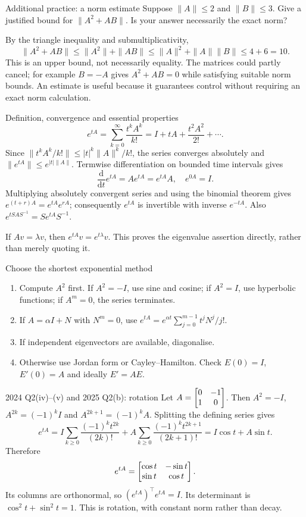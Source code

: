 \begin{question}{Additional practice: a norm estimate}
Suppose $\|A\|\leq2$ and $\|B\|\leq3$. Give a justified bound for $\|A^2+AB\|$. Is your answer necessarily the exact norm?
\end{question}
\begin{answer}
By the triangle inequality and submultiplicativity,
\[\|A^2+AB\|\leq\|A^2\|+\|AB\|\leq\|A\|^2+\|A\|\|B\|\leq4+6=10.\]
This is an upper bound, not necessarily equality. The matrices could partly cancel; for example $B=-A$ gives $A^2+AB=0$ while satisfying suitable norm bounds. An estimate is useful because it guarantees control without requiring an exact norm calculation.
\end{answer}

\begin{concept}{Definition, convergence and essential properties}
\[e^{tA}=\sum_{k=0}^{\infty}\frac{t^kA^k}{k!}=I+tA+\frac{t^2A^2}{2!}+\cdots.\]
Since $\|t^kA^k/k!\|\leq |t|^k\|A\|^k/k!$, the series converges absolutely and $\|e^{tA}\|\leq e^{|t|\|A\|}$. Termwise differentiation on bounded time intervals gives
\[\frac{\mathrm d}{\mathrm dt}e^{tA}=Ae^{tA}=e^{tA}A,\quad e^{0A}=I.\]
Multiplying absolutely convergent series and using the binomial theorem gives $e^{(t+r)A}=e^{tA}e^{rA}$; consequently $e^{tA}$ is invertible with inverse $e^{-tA}$. Also $e^{tSAS^{-1}}=Se^{tA}S^{-1}$.

If $Av=\lambda v$, then $e^{tA}v=e^{t\lambda}v$. This proves the eigenvalue assertion directly, rather than merely quoting it.
\end{concept}
\begin{method}{Choose the shortest exponential method}
\begin{enumerate}
\item Compute $A^2$ first. If $A^2=-I$, use sine and cosine; if $A^2=I$, use hyperbolic functions; if $A^m=0$, the series terminates.
\item If $A=\alpha I+N$ with $N^m=0$, use $e^{tA}=e^{\alpha t}\sum_{j=0}^{m-1}t^jN^j/j!$.
\item If independent eigenvectors are available, diagonalise.
\item Otherwise use Jordan form or Cayley--Hamilton. Check $E(0)=I$, $E'(0)=A$ and ideally $E'=AE$.
\end{enumerate}
\end{method}
\begin{worked}{2024 Q2(iv)--(v) and 2025 Q2(b): rotation}
Let $A=\begin{bmatrix}0&-1\\1&0\end{bmatrix}$. Then $A^2=-I$, $A^{2k}=(-1)^kI$ and $A^{2k+1}=(-1)^kA$. Splitting the defining series gives
\[e^{tA}=I\sum_{k\geq0}\frac{(-1)^kt^{2k}}{(2k)!}+A\sum_{k\geq0}\frac{(-1)^kt^{2k+1}}{(2k+1)!}=I\cos t+A\sin t.\]
Therefore
\[e^{tA}=\begin{bmatrix}\cos t&-\sin t\\\sin t&\cos t\end{bmatrix}.\]
Its columns are orthonormal, so $(e^{tA})^{\top}e^{tA}=I$. Its determinant is $\cos^2t+\sin^2t=1$. This is rotation, with constant norm rather than decay.
\end{worked}

